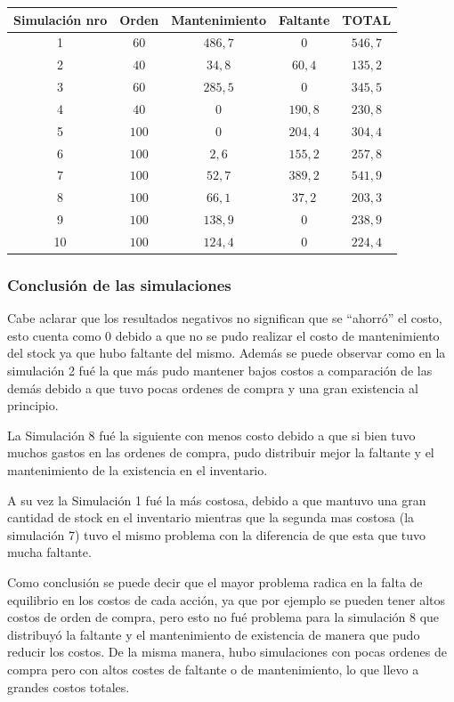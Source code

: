 \begin{tabular}{||c||c|c|c|c||}
    \hline \hline
    Simulación nro & Orden & Mantenimiento & Faltante & TOTAL\\
    \hline \hline
    1 & $60$ & $486,7$ & $0$ & $546,7$\\
    \hline
    2 & $40$ & $34,8$ & $60,4$ & $135,2$\\
    \hline
    3 & $60$ & $285,5$ & $0$ & $345,5$\\
    \hline
    4 & $40$ & $0$ & $190,8$ & $230,8$\\
    \hline
    5 & $100$ & $0$ & $204,4$ & $304,4$\\
    \hline
    6 & $100$ & $2,6$ & $155,2$ & $257,8$\\
    \hline
    7 & $100$ & $52,7$ & $389,2$ & $541,9$\\
    \hline
    8 & $100$ & $66,1$ & $37,2$ & $203,3$\\
    \hline
    9 & $100$ & $138,9$ & $0$ & $238,9$\\
    \hline
    10 & $100$ & $124,4$ & $0$ &$224,4$\\
    \hline \hline
\end{tabular}

\subsubsection{Conclusión de las simulaciones}\label{subsubsec:conclusiones}
Cabe aclarar que los resultados negativos no significan que se ``ahorró'' el costo, esto cuenta como 0 debido a que no se pudo realizar el costo de mantenimiento del stock ya que hubo faltante del mismo.
Además se puede observar como en la simulación 2 fué la que más pudo mantener bajos costos a comparación de las demás debido a que tuvo pocas ordenes de compra y una gran existencia al principio.

La Simulación 8 fué la siguiente con menos costo debido a que si bien tuvo muchos gastos en las ordenes de compra, pudo distribuir mejor la faltante y el mantenimiento de la existencia en el inventario.

A su vez la Simulación 1 fué la más costosa, debido a que mantuvo una gran cantidad de stock en el inventario mientras que la segunda mas costosa (la simulación 7) tuvo el mismo problema con la diferencia de que esta que tuvo mucha faltante.

Como conclusión se puede decir que el mayor problema radica en la falta de equilibrio en los costos de cada acción, ya que por ejemplo se pueden tener altos costos de orden de compra, pero esto no fué problema para la simulación 8 que distribuyó la faltante y el mantenimiento de existencia de manera que pudo reducir los costos.
De la misma manera, hubo simulaciones con pocas ordenes de compra pero con altos costes de faltante o de mantenimiento, lo que llevo a grandes costos totales.

